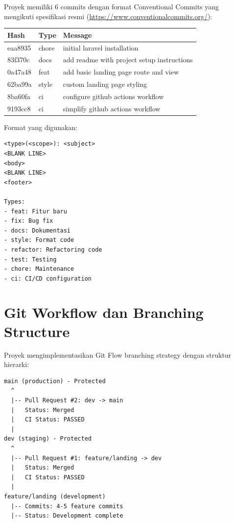 \documentclass[a4paper,oneside,11pt]{book}
\begin{document}
Proyek memiliki 6 commits dengan format Conventional Commits yang mengikuti spesifikasi resmi (\url{https://www.conventionalcommits.org/}):

\begin{center}
\begin{tabular}{|l|l|l|}
\hline
\textbf{Hash} & \textbf{Type} & \textbf{Message} \\
\hline
eaa8935 & chore & initial laravel installation \\
\hline
83f370c & docs & add readme with project setup instructions \\
\hline
0a47a48 & feat & add basic landing page route and view \\
\hline
62ba99a & style & custom landing page styling \\
\hline
8ba60fa & ci & configure github actions workflow \\
\hline
9193cc8 & ci & simplify github actions workflow \\
\hline
\end{tabular}
\end{center}

Format yang digunakan:
\begin{lstlisting}[style=yamlStyle, caption={Format Conventional Commits}, label={kode:commits}]
<type>(<scope>): <subject>
<BLANK LINE>
<body>
<BLANK LINE>
<footer>

Types:
- feat: Fitur baru
- fix: Bug fix
- docs: Dokumentasi
- style: Format code
- refactor: Refactoring code
- test: Testing
- chore: Maintenance
- ci: CI/CD configuration
\end{lstlisting}

\section{Git Workflow dan Branching Structure}

Proyek mengimplementasikan Git Flow branching strategy dengan struktur hierarki:

\begin{lstlisting}[style=yamlStyle, caption={Git Flow Structure}, label={kode:gitflow}]
main (production) - Protected
  ^
  |-- Pull Request #2: dev -> main
  |   Status: Merged
  |   CI Status: PASSED
  |
dev (staging) - Protected
  ^
  |-- Pull Request #1: feature/landing -> dev
  |   Status: Merged
  |   CI Status: PASSED
  |
feature/landing (development)
  |-- Commits: 4-5 feature commits
  |-- Status: Development complete
\end{lstlisting}
\end{document}
